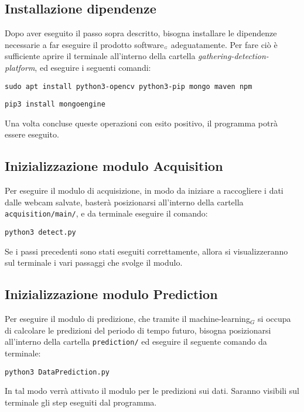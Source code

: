 \subsection{Installazione dipendenze}\label{RequisitiDiSistemaEdInstallazioneInstallazioneInstallazioneDipendenze}
Dopo aver eseguito il passo sopra descritto, bisogna installare le dipendenze necessarie a far eseguire il prodotto software$_{\scaleto{G}{3pt}}$ adeguatamente.
Per fare ciò è sufficiente aprire il terminale all'interno della cartella \textit{gathering-detection-platform}, ed eseguire i seguenti comandi:
\begin{lstlisting}
sudo apt install python3-opencv python3-pip mongo maven npm
\end{lstlisting}
\begin{lstlisting}
pip3 install mongoengine
\end{lstlisting}

Una volta concluse queste operazioni con esito positivo, il programma potrà essere eseguito.

\subsection{Inizializzazione modulo Acquisition}\label{RequisitiDiSistemaEdInstallazioneInstallazioneInizializzazioneModuloAcquisition}
Per eseguire il modulo di acquisizione, in modo da iniziare a raccogliere i dati dalle webcam salvate, basterà posizionarsi all'interno della cartella \texttt{acquisition/main/}, e da terminale eseguire il comando:
\begin{lstlisting}
python3 detect.py
\end{lstlisting}
Se i passi precedenti sono stati eseguiti correttamente, allora si visualizzeranno sul terminale i vari passaggi che svolge il modulo.


\subsection{Inizializzazione modulo Prediction}\label{RequisitiDiSistemaEdInstallazioneInstallazioneInizializzazioneModuloPrediction}
Per eseguire il modulo di predizione, che tramite il machine-learning$_G$ si occupa di calcolare le predizioni del periodo di tempo futuro, bisogna posizionarsi all'interno della cartella \texttt{prediction/} ed eseguire il seguente comando da terminale:

\begin{lstlisting}
python3 DataPrediction.py
\end{lstlisting}
In tal modo verrà attivato il modulo per le predizioni sui dati.
Saranno visibili sul terminale gli step eseguiti dal programma.

